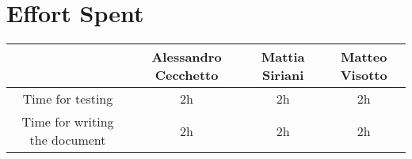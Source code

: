 \section{Effort Spent}
\begin{table}[h!]
    \centering
    \begin{tabular}{c||c|c|c}
     & Alessandro Cecchetto & Mattia Siriani & Matteo Visotto \\ \hline \hline
        Time for testing & 2h & 2h & 2h \\ \hline 
        Time for writing the document & 2h & 2h & 2h \\ \hline 
    \end{tabular}
\end{table}